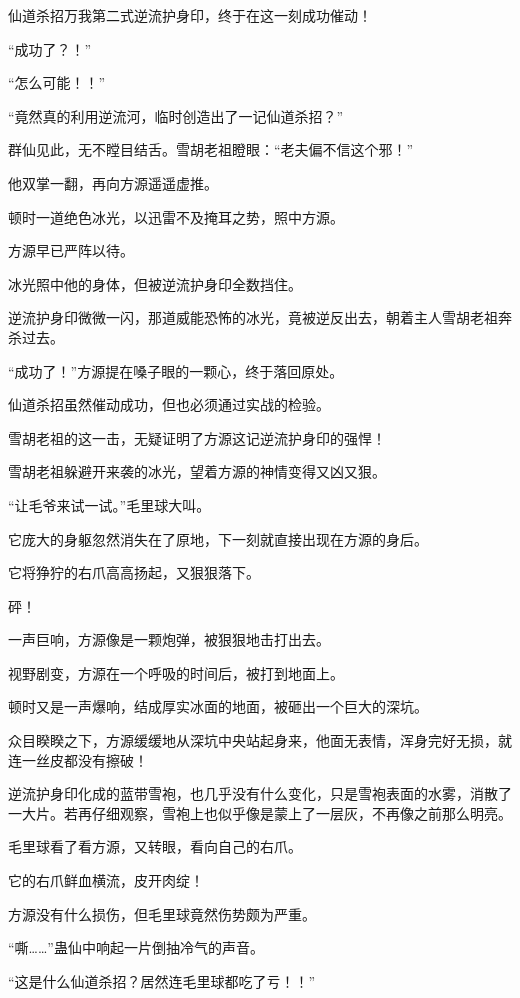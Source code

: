 \begin{this_body}
仙道杀招万我第二式逆流护身印，终于在这一刻成功催动！

“成功了？！”

“怎么可能！！”

“竟然真的利用逆流河，临时创造出了一记仙道杀招？”

群仙见此，无不瞠目结舌。雪胡老祖瞪眼：“老夫偏不信这个邪！”

他双掌一翻，再向方源遥遥虚推。

顿时一道绝色冰光，以迅雷不及掩耳之势，照中方源。

方源早已严阵以待。

冰光照中他的身体，但被逆流护身印全数挡住。

逆流护身印微微一闪，那道威能恐怖的冰光，竟被逆反出去，朝着主人雪胡老祖奔杀过去。

“成功了！”方源提在嗓子眼的一颗心，终于落回原处。

仙道杀招虽然催动成功，但也必须通过实战的检验。

雪胡老祖的这一击，无疑证明了方源这记逆流护身印的强悍！

雪胡老祖躲避开来袭的冰光，望着方源的神情变得又凶又狠。

“让毛爷来试一试。”毛里球大叫。

它庞大的身躯忽然消失在了原地，下一刻就直接出现在方源的身后。

它将狰狞的右爪高高扬起，又狠狠落下。

砰！

一声巨响，方源像是一颗炮弹，被狠狠地击打出去。

视野剧变，方源在一个呼吸的时间后，被打到地面上。

顿时又是一声爆响，结成厚实冰面的地面，被砸出一个巨大的深坑。

众目睽睽之下，方源缓缓地从深坑中央站起身来，他面无表情，浑身完好无损，就连一丝皮都没有擦破！

逆流护身印化成的蓝带雪袍，也几乎没有什么变化，只是雪袍表面的水雾，消散了一大片。若再仔细观察，雪袍上也似乎像是蒙上了一层灰，不再像之前那么明亮。

毛里球看了看方源，又转眼，看向自己的右爪。

它的右爪鲜血横流，皮开肉绽！

方源没有什么损伤，但毛里球竟然伤势颇为严重。

“嘶……”蛊仙中响起一片倒抽冷气的声音。

“这是什么仙道杀招？居然连毛里球都吃了亏！！”


\end{this_body}

